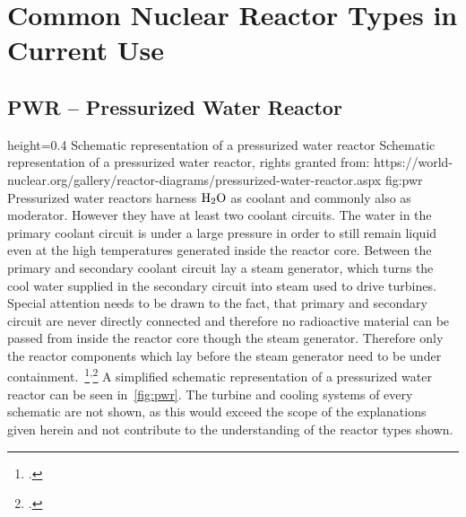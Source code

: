 \chapter{Common Nuclear Reactor Types in Current Use} 
\section{PWR – Pressurized Water Reactor}
    {height=0.4\textheight}
    {Schematic representation of a pressurized water reactor}
    {Schematic representation of a pressurized water reactor, rights granted from: https://world-nuclear.org/gallery/reactor-diagrams/pressurized-water-reactor.aspx}
    {fig:pwr}
Pressurized water reactors harness $\ce{H_{2}O}$ as coolant and commonly also as moderator. However they have at least
two coolant circuits. The water in the primary coolant circuit is under a large pressure in order
to still remain liquid even at the high temperatures generated inside the reactor core. Between the primary
and secondary coolant circuit lay a steam generator, which turns the cool water supplied in the secondary circuit
into steam used to drive turbines. Special attention needs to be drawn to the fact, that primary and secondary
circuit are never directly connected and therefore no radioactive material can be passed from inside the reactor core
though the steam generator. Therefore only the reactor components which lay before the steam generator
need to be under containment.~\footcite{WNPR}\textsuperscript{,}\footcite[14-84]{engHandbook} 
A simplified schematic representation of a pressurized water reactor can be seen in~\ref{fig:pwr}. The
turbine and cooling systems of every schematic are not shown, as this would exceed the scope of the
explanations given herein and not contribute to the understanding of the reactor types shown.
\pagebreak
